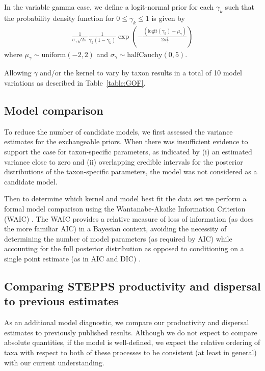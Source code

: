 \documentclass[12pt]{article}
\begin{document}
In the variable gamma case, we define a logit-normal prior for each
$\gamma_k$ such that the probability density function for $0 \leq
\gamma_k \leq 1$ is given by
\begin{align}
\frac{1}{\sigma_\gamma \sqrt{2 \pi}}\frac{1}{ \gamma_k ( 1 - \gamma_k )}\exp \left(- \frac{(\text{logit}(\gamma_k) - \mu_{\gamma})}{2 \sigma_{\gamma}^2} \right)
\end{align} 
where $\mu_{\gamma} \sim \text{uniform}(-2, 2)$ and $\sigma_{\gamma}
\sim \text{halfCauchy}(0,5)$.

Allowing $\gamma$ and/or the kernel to vary by taxon results in a
total of 10 model variations as described in Table~\ref{table:GOF}.

\subsection{Model comparison}

To reduce the number of candidate models, we first assessed the
variance estimates for the exchangeable priors. When there was
insufficient evidence to support the case for taxon-specific
parameters, as indicated by (i) an estimated variance close to zero
and (ii) overlapping credible intervals for the posterior
distributions of the taxon-specific parameters, the model was not
considered as a candidate model.

Then to determine which kernel and model best fit the data set we
perform a formal model comparison using the Wantanabe-Akaike
Information Criterion (WAIC) \citep{watanabe2010asymptotic}. The WAIC
provides a relative measure of loss of information (as does the more
familiar AIC) in a Bayesian context, avoiding the necessity of
determining the number of model parameters (as required by AIC) while
accounting for the full posterior distribution as opposed to
conditioning on a single point estimate (as in AIC and DIC)
\citep{gelman2014understanding}.

\subsection{Comparing STEPPS productivity and dispersal to
  previous estimates}

As an additional model diagnostic, we compare our productivity and
dispersal estimates to previously published results. Although we do
not expect to compare absolute quantities, if the model is
well-defined, we expect the relative ordering of taxa with respect to
both of these processes to be consistent (at least in general) with
our current understanding.
\end{document}
